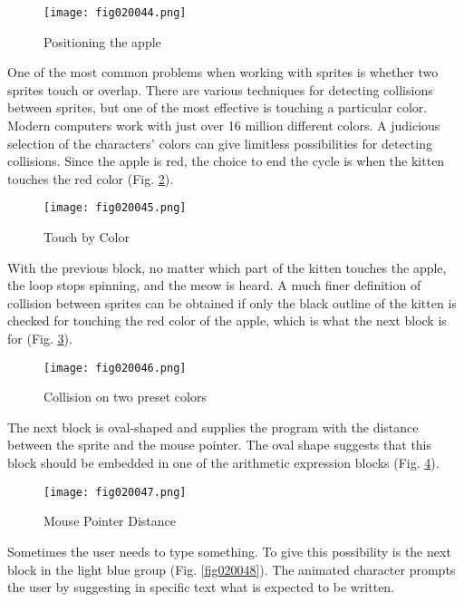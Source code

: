\begin{figure}[H]
   \centering
   \texttt{[image: fig020044.png]}
   \caption{Positioning the apple}
\label{fig020044}
\end{figure}

One of the most common problems when working with sprites is whether two sprites touch or overlap. There are various techniques for detecting collisions between sprites, but one of the most effective is touching a particular color. Modern computers work with just over 16 million different colors. A judicious selection of the characters' colors can give limitless possibilities for detecting collisions. Since the apple is red, the choice to end the cycle is when the kitten touches the red color (Fig. \ref{fig020045}).

\begin{figure}[H]
   \centering
   \texttt{[image: fig020045.png]}
   \caption{Touch by Color}
\label{fig020045}
\end{figure}

With the previous block, no matter which part of the kitten touches the apple, the loop stops spinning, and the meow is heard. A much finer definition of collision between sprites can be obtained if only the black outline of the kitten is checked for touching the red color of the apple, which is what the next block is for (Fig. \ref{fig020046}).

\begin{figure}[H]
   \centering
   \texttt{[image: fig020046.png]}
   \caption{Collision on two preset colors}
\label{fig020046}
\end{figure}

The next block is oval-shaped and supplies the program with the distance between the sprite and the mouse pointer. The oval shape suggests that this block should be embedded in one of the arithmetic expression blocks (Fig. \ref{fig020047}).

\begin{figure}[H]
   \centering
   \texttt{[image: fig020047.png]}
   \caption{Mouse Pointer Distance}
\label{fig020047}
\end{figure}

Sometimes the user needs to type something. To give this possibility is the next block in the light blue group (Fig. \ref{fig020048}). The animated character prompts the user by suggesting in specific text what is expected to be written.

